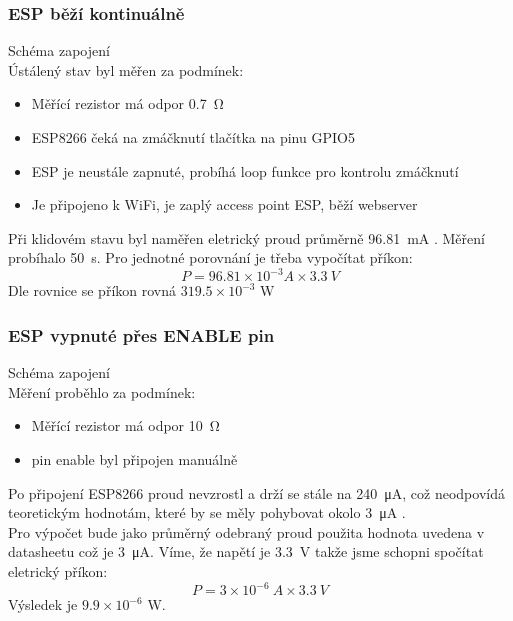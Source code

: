 \documentclass[a4paper, 12pt]{report}
\begin{document}
				\subsubsection{ESP běží kontinuálně}
					Schéma zapojení  \\
					Ústálený stav byl měřen za podmínek:
					\begin{itemize}
						\item Měřící rezistor má odpor \SI{0.7}{\ohm}
						\item ESP8266 čeká na zmáčknutí tlačítka na pinu GPIO5
						\item ESP je neustále zapnuté, probíhá loop funkce pro kontrolu zmáčknutí
						\item Je připojeno k WiFi, je zaplý access point ESP, běží webserver
					\end{itemize}
		 			Při klidovém stavu byl naměřen eletrický proud průměrně \SI{96.81}{mA} . Měření probíhalo \SI{50}{s}. Pro jednotné porovnání je třeba vypočítat příkon:
						$$P = 96.81 \times 10^{-3}\si{ A} \times \SI{3.3}{ V}$$
		 			Dle rovnice se příkon rovná $ 319.5 \times 10^{-3}$ \si{\watt}\\

				\subsubsection{ESP vypnuté přes ENABLE pin}
					Schéma zapojení \\
					Měření proběhlo za podmínek:
					\begin{itemize}
						\item Měřící rezistor má odpor \SI{10}{\ohm}
						\item pin enable byl připojen manuálně
					\end{itemize}
					Po připojení ESP8266 proud nevzrostl a drží se stále na \SI{240}{\micro A}, což neodpovídá teoretickým hodnotám, které by se měly pohybovat okolo \SI{3}{\micro A}
					.\\
					Pro výpočet bude jako průměrný odebraný proud použita hodnota uvedena v datasheetu což je \SI{3}{\micro A}. Víme, že napětí je \SI{3.3}{V} takže jsme schopni spočítat eletrický příkon:
				 		$$P = 3\times 10^{-6} \SI{}{A}\times \SI{3.3}{V}$$
					Výsledek je $9.9 \times 10^{-6}$ \si{\watt}.
\end{document}
